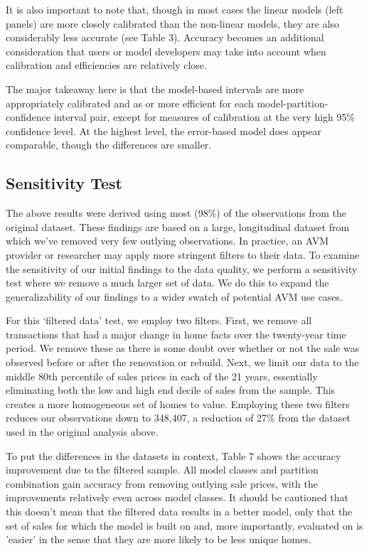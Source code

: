 \documentclass[colTwo]{anon}
\theoremstyle{definition}
\begin{document}
It is also important to note that, though in most cases the linear models (left panels) are more closely calibrated than the non-linear models, they are also considerably less accurate (see Table 3).  Accuracy becomes an additional consideration that users or model developers may take into account when calibration and efficiencies are relatively close.    

The major takeaway here is that the model-based intervals are more appropriately calibrated and as or more efficient for each model-partition-confidence interval pair, except for measures of calibration at the very high 95\% confidence level.  At the highest level, the error-based model does appear comparable, though the differences are smaller.  

\subsection{Sensitivity Test}

The above results were derived using most (98\%) of the observations from the original dataset. These findings are based on a large, longitudinal dataset from which we’ve removed very few outlying observations. In practice, an AVM provider or researcher may apply more stringent filters to their data. To examine the sensitivity of our initial findings to the data quality, we perform a sensitivity test where we remove a much larger set of data. We do this to expand the generalizability of our findings to a wider swatch of potential AVM use cases. 

For this ‘filtered data’ test, we employ two filters.  First, we remove all transactions that had a major change in home facts over the twenty-year time period.  We remove these as there is some doubt over whether or not the sale was observed before or after the renovation or rebuild. Next, we limit our data to the middle 80th percentile of sales prices in each of the 21 years, essentially eliminating both the low and high end decile of sales from the sample.  This creates a more homogeneous set of homes to value.  Employing these two filters reduces our observations down to 348,407, a reduction of 27\% from the dataset used in the original analysis above.  

To put the differences in the datasets in context, Table 7 shows the accuracy improvement due to the filtered sample.  All model classes and partition combination gain accuracy from removing outlying sale prices, with the improvements relatively even across model classes. It should be cautioned that this doesn't mean that the filtered data results in a better model, only that the set of sales for which the model is built on and, more importantly, evaluated on is 'easier' in the sense that they are more likely to be less unique homes. 
\end{document}

